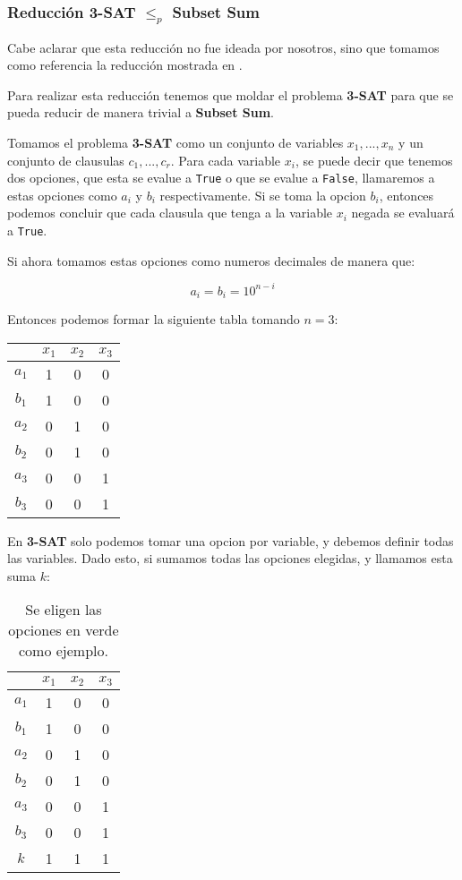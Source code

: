 \subsubsection*{Reducci\'on 3-SAT $\le_{p}$ Subset Sum}

Cabe aclarar que esta reducci\'on no fue ideada por nosotros, sino que tomamos 
como referencia la reducci\'on mostrada en \cite{pcmi2007lectureB07}.

Para realizar esta reducci\'on tenemos que moldar el problema \textbf{3-SAT} para 
que se pueda reducir de manera trivial a \textbf{Subset Sum}.

Tomamos el problema \textbf{3-SAT} como un conjunto de variables $x_1, ..., x_n$
y un conjunto de clausulas $c_1, ..., c_r$. 
Para cada variable $x_i$, se puede decir que tenemos dos opciones, que esta se 
evalue a \texttt{True} o que se evalue a \texttt{False}, llamaremos a estas 
opciones como $a_i$ y $b_i$ respectivamente. 
Si se toma la opcion $b_i$, entonces podemos concluir que cada clausula que 
tenga a la variable $x_i$ negada se evaluar\'a a \texttt{True}. 

Si ahora tomamos estas opciones como numeros decimales de manera que: 

\[
  a_i = b_i = 10^{n-i}
\]

Entonces podemos formar la siguiente tabla tomando $n=3$: 

\begin{center}
\begin{tabular}{ c|c c c }
  & $x_1$ & $x_2$ & $x_3$ \\
  \hline 
  $a_1$ & 1 & 0 & 0 \\
  $b_1$ & 1 & 0 & 0 \\
  $a_2$ & 0 & 1 & 0 \\
  $b_2$ & 0 & 1 & 0 \\
  $a_3$ & 0 & 0 & 1 \\
  $b_3$ & 0 & 0 & 1 \\
\end{tabular} 
\end{center}

\newpage 
  
En \textbf{3-SAT} solo podemos tomar una opcion por variable, y debemos definir 
todas las variables. Dado esto, si sumamos todas las opciones elegidas, y 
llamamos esta suma $k$: 

\begin{table}[h!]
  \centering
  \begin{tabular}{ c|c c c }
    & $x_1$ & $x_2$ & $x_3$ \\
    \hline 
    $a_1$ & 1 & 0 & 0 \\
    \rowcolor{green!30}
    $b_1$ & 1 & 0 & 0 \\
    \rowcolor{green!30}
    $a_2$ & 0 & 1 & 0 \\
    $b_2$ & 0 & 1 & 0 \\
    $a_3$ & 0 & 0 & 1 \\
    \rowcolor{green!30}
    $b_3$ & 0 & 0 & 1 \\
    \hline
    $k$ & 1 & 1 & 1 \\
  \end{tabular} 
  \caption*{Se eligen las opciones en verde como ejemplo.}
\end{table}

